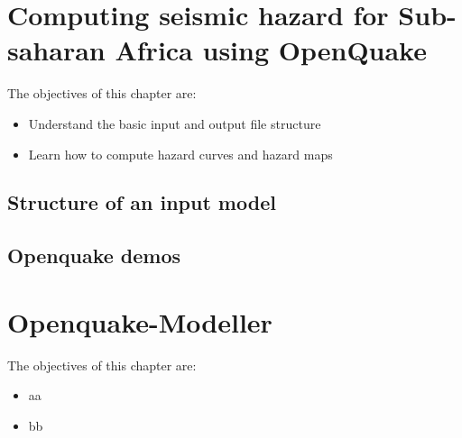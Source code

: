 \documentclass[11pt,a4paper,headings=small,dvips]{scrbook}
\newenvironment{myfancybox}{%
  \def\FrameCommand{\fboxsep=\FrameSep \fcolorbox{blue01}{honeydew}}%
  \color{black}\MakeFramed {\FrameRestore}}%
 {\endMakeFramed}
\begin{document}
\chapter{Computing seismic hazard for Sub-saharan Africa using OpenQuake}
\begin{myfancybox}
The objectives of this chapter are:
\begin{itemize}
    \item Understand the basic input and output file structure
    \item Learn how to compute hazard curves and hazard maps
\end{itemize}
\end{myfancybox}
    
\section{Structure of an input model}
\section{Openquake demos}
\cleardoublepage
\chapter{Openquake-Modeller}
\begin{myfancybox}
The objectives of this chapter are:
\begin{itemize}
    \item aa
    \item bb
\end{itemize}
\end{myfancybox}
  
\cleardoublepage
\end{document}
